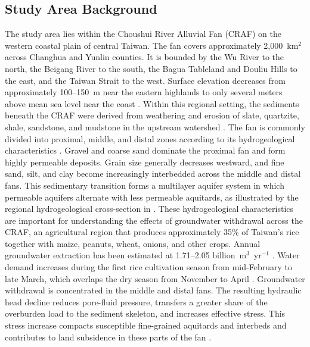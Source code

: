 \subsection{Study Area Background}
\label{subsec:study_area}

The study area lies within the Choushui River Alluvial Fan (CRAF) on the western coastal plain of central Taiwan. The fan covers approximately 2,000~km$^2$ across Changhua and Yunlin counties. It is bounded by the Wu River to the north, the Beigang River to the south, the Bagua Tableland and Douliu Hills to the east, and the Taiwan Strait to the west. Surface elevation decreases from approximately 100--150~m near the eastern highlands to only several meters above mean sea level near the coast \citep{survey_project_1999, liu_characterization_2004}. Within this regional setting, the sediments beneath the CRAF were derived from weathering and erosion of slate, quartzite, shale, sandstone, and mudstone in the upstream watershed \citep{liu_characterization_2004, hung2015_multiple}. The fan is commonly divided into proximal, middle, and distal zones according to its hydrogeological characteristics \citep{survey_project_1999}. Gravel and coarse sand dominate the proximal fan and form highly permeable deposits. Grain size generally decreases westward, and fine sand, silt, and clay become increasingly interbedded across the middle and distal fans. This sedimentary transition forms a multilayer aquifer system in which permeable aquifers alternate with less permeable aquitards, as illustrated by the regional hydrogeological cross-section in . These hydrogeological characteristics are important for understanding the effects of groundwater withdrawal across the CRAF, an agricultural region that produces approximately 35\% of Taiwan's rice together with maize, peanuts, wheat, onions, and other crops. Annual groundwater extraction has been estimated at 1.71--2.05 billion~m$^3$~yr$^{-1}$ \citep{tseng_estimating_2024}. Water demand increases during the first rice cultivation season from mid-February to late March, which overlaps the dry season from November to April \citep{chang_rice-field_2020}. Groundwater withdrawal is concentrated in the middle and distal fans. The resulting hydraulic head decline reduces pore-fluid pressure, transfers a greater share of the overburden load to the sediment skeleton, and increases effective stress. This stress increase compacts susceptible fine-grained aquitards and interbeds and contributes to land subsidence in these parts of the fan \citep{liu_characterization_2004, hung2015_multiple}.

